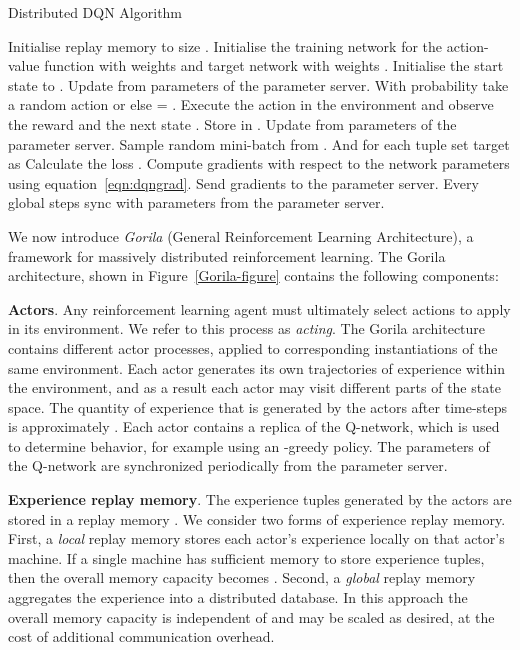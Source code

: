 \documentclass{article}
\begin{document}
\begin{algorithm}[t]
	\caption{Distributed DQN Algorithm}
	\label{alg:DistDQNAlgo}
	\begin{algorithmic}
		\STATE Initialise replay memory  to size .
		\STATE Initialise the training network for the action-value function  with weights  and target network  with weights .
		\STATE Initialise the start state to .
		\STATE Update  from parameters  of the parameter server.
		\STATE With probability  take a random action  or else  = .
		\STATE Execute the action in the environment and observe the reward  and the next state . Store  in .
		\STATE Update  from parameters  of the parameter server.
		\STATE Sample random mini-batch from . And for each tuple  set target  as
		\STATE 
		\ELSE
		\STATE 
		\ENDIF
		\STATE Calculate the loss .
		\STATE Compute gradients with respect to the network parameters  using equation~\ref{eqn:dqngrad}.
		\STATE Send gradients to the parameter server.
		\STATE Every global  steps sync  with parameters  from the parameter server.
		\ENDFOR
		\ENDFOR
	\end{algorithmic}
\end{algorithm}

We now introduce \emph{Gorila} (General Reinforcement Learning Architecture), a framework for massively distributed reinforcement learning. The Gorila architecture, shown in Figure~\ref{Gorila-figure} contains the following components:

{\bf Actors}. Any reinforcement learning agent must ultimately select actions  to apply in its environment. We refer to this process as \emph{acting}. The Gorila architecture contains  different actor processes, applied to  corresponding instantiations of the same environment. Each actor  generates its own trajectories of experience  within the environment, and as a result each actor may visit different parts of the state space. The quantity of experience that is generated by the actors after  time-steps is approximately . Each actor contains a replica of the Q-network, which is used to determine behavior, for example using an -greedy policy. The parameters of the Q-network are synchronized periodically from the parameter server.

{\bf Experience replay memory}. The experience tuples  generated by the actors are stored in a replay memory . We consider two forms of experience replay memory. First, a \emph{local} replay memory stores each actor's experience  locally on that actor's machine. If a single machine has sufficient memory to store  experience tuples, then the overall memory capacity becomes . Second, a \emph{global} replay memory aggregates the experience into a distributed database. In this approach the overall memory capacity is independent of  and may be scaled as desired, at the cost of additional communication overhead.
\end{document}
